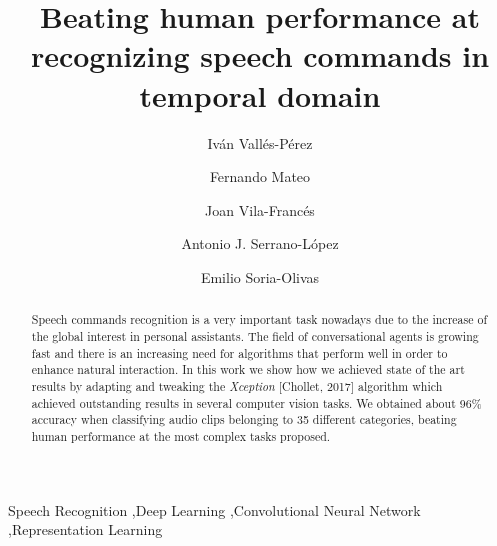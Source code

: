 \documentclass[review]{elsarticle}
\begin{document}
\begin{frontmatter}

\title{Beating human performance at recognizing speech commands in temporal domain}

\author[UV]{Iván Vallés-Pérez}
\author[UV]{Fernando Mateo}
\author[UV]{Joan Vila-Francés}
\author[UV]{Antonio J. Serrano-López}
\author[UV]{Emilio Soria-Olivas}







\address[UV]{Escola Tècnica Superior d\textsc{}Enginyeria, University of Valencia, Avenida de la Universitat s/n 46100 Burjassot, Valencia, Spain}

\begin{abstract}
Speech commands recognition is a very important task nowadays due to the increase of the global interest in personal assistants. The field of conversational agents is growing fast and there is an increasing need for algorithms that perform well in order to enhance natural interaction. In this work we show how we achieved state of the art results by adapting and tweaking the \textit{Xception} [Chollet, 2017] algorithm which achieved outstanding results in several computer vision tasks. We obtained about 96\% accuracy when classifying audio clips belonging to 35 different categories, beating human performance at the most complex tasks proposed.
\end{abstract}

\begin{keyword}
Speech Recognition \sep Deep Learning \sep Convolutional Neural Network \sep Representation Learning
\end{keyword}

\end{frontmatter}
\end{document}

